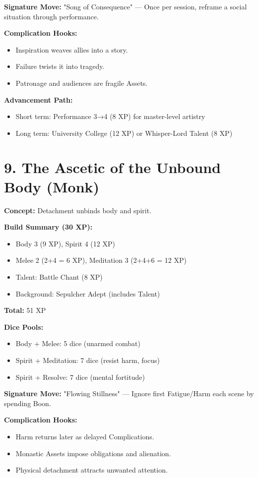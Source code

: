 \textbf{Signature Move:} "Song of Consequence" — Once per session, reframe a social situation through performance.

\textbf{Complication Hooks:}
\begin{itemize}
  \item Inspiration weaves allies into a story.
  \item Failure twists it into tragedy.
  \item Patronage and audiences are fragile Assets.
\end{itemize}

\textbf{Advancement Path:}
\begin{itemize}
  \item Short term: Performance 3→4 (8 XP) for master-level artistry
  \item Long term: University College (12 XP) or Whisper-Lord Talent (8 XP)
\end{itemize}

\section{9. The Ascetic of the Unbound Body (Monk)}

\textbf{Concept:} Detachment unbinds body and spirit.

\textbf{Build Summary (30 XP):}
\begin{itemize}
  \item Body 3 (9 XP), Spirit 4 (12 XP)
  \item Melee 2 (2+4 = 6 XP), Meditation 3 (2+4+6 = 12 XP)
  \item Talent: Battle Chant (8 XP)
  \item Background: Sepulcher Adept (includes Talent)
\end{itemize}
\textbf{Total:} 51 XP

\textbf{Dice Pools:}
\begin{itemize}
  \item Body + Melee: 5 dice (unarmed combat)
  \item Spirit + Meditation: 7 dice (resist harm, focus)
  \item Spirit + Resolve: 7 dice (mental fortitude)
\end{itemize}

\textbf{Signature Move:} "Flowing Stillness" — Ignore first Fatigue/Harm each scene by spending Boon.

\textbf{Complication Hooks:}
\begin{itemize}
  \item Harm returns later as delayed Complications.
  \item Monastic Assets impose obligations and alienation.
  \item Physical detachment attracts unwanted attention.
\end{itemize}

